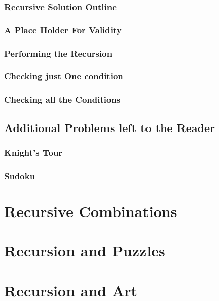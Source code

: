 \documentclass[10pt,a4paper]{book}
\begin{document}
\subsubsection{Recursive Solution Outline}

\subsubsection{A Place Holder For Validity}

\subsubsection{Performing the Recursion}

\subsubsection{Checking just One condition}


\subsubsection{Checking all the Conditions}




\subsection{Additional Problems left to the Reader}

\subsubsection{Knight's Tour}

\subsubsection{Sudoku}




\section{Recursive Combinations}



\section{Recursion and Puzzles}



\section{Recursion and Art}
\end{document}
